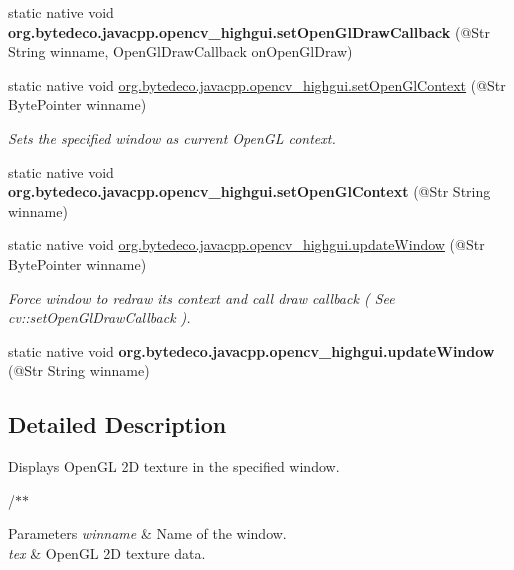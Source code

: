 \begin{DoxyCompactItemize}
\item 
\mbox{\label{group__highgui__opengl_ga25e2b70ca169b586c09762fd90de479c}} 
static native void {\bfseries org.\+bytedeco.\+javacpp.\+opencv\+\_\+highgui.\+set\+Open\+Gl\+Draw\+Callback} (@Str String winname, Open\+Gl\+Draw\+Callback on\+Open\+Gl\+Draw)
\item 
static native void \hyperlink{group__highgui__opengl_ga14e8539bd809672c266a0dc6c11e4b91}{org.\+bytedeco.\+javacpp.\+opencv\+\_\+highgui.\+set\+Open\+Gl\+Context} (@Str Byte\+Pointer winname)
\begin{DoxyCompactList}\small\item\em Sets the specified window as current Open\+GL context. \end{DoxyCompactList}\item 
\mbox{\label{group__highgui__opengl_gad7fae14ab67aad1046c54989dfba9388}} 
static native void {\bfseries org.\+bytedeco.\+javacpp.\+opencv\+\_\+highgui.\+set\+Open\+Gl\+Context} (@Str String winname)
\item 
static native void \hyperlink{group__highgui__opengl_ga71eba7e13ffedf80c0d621ae9acacfb8}{org.\+bytedeco.\+javacpp.\+opencv\+\_\+highgui.\+update\+Window} (@Str Byte\+Pointer winname)
\begin{DoxyCompactList}\small\item\em Force window to redraw its context and call draw callback ( See cv\+::set\+Open\+Gl\+Draw\+Callback ). \end{DoxyCompactList}\item 
\mbox{\label{group__highgui__opengl_ga4e7ae9c8b57d9effcdfd62f41c99a20e}} 
static native void {\bfseries org.\+bytedeco.\+javacpp.\+opencv\+\_\+highgui.\+update\+Window} (@Str String winname)
\end{DoxyCompactItemize}


\subsection{Detailed Description}
Displays Open\+GL 2D texture in the specified window. 

/$\ast$$\ast$


\begin{DoxyParams}{Parameters}
{\em winname} & Name of the window. \\
\hline
{\em tex} & Open\+GL 2D texture data. \\
\hline
\end{DoxyParams}


